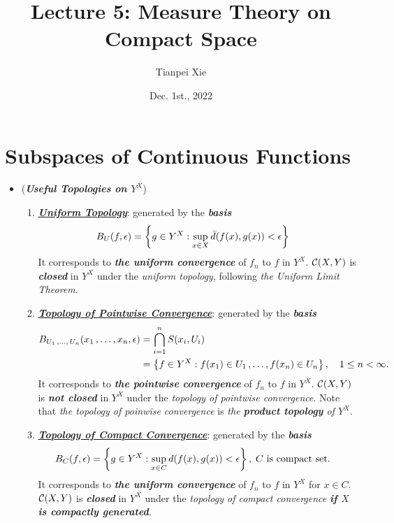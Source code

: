 \documentclass[11pt]{article}
\begin{document}
\title{Lecture 5: Measure Theory on Compact Space}
\author{ Tianpei Xie}
\date{ Dec. 1st., 2022 }
\maketitle
\tableofcontents
\newpage
\section{Subspaces of Continuous Functions}
\begin{itemize}
\item \begin{remark} (\emph{\textbf{Useful Topologies on $Y^X$}})
\begin{enumerate}
\item \underline{\emph{\textbf{Uniform Topology}}}: generated by the \emph{\textbf{basis}}
\begin{align*}
B_{U}(f, \epsilon) &= \left\{g \in Y^X: \sup_{x\in X}\bar{d}(f(x), g(x)) < \epsilon \right\}
\end{align*} It corresponds to \emph{\textbf{the uniform convergence}} of $f_n$ to $f$ in $Y^X$. ${\mathcal C}(X, Y)$ is \emph{\textbf{closed}} in $Y^X$ under the \emph{uniform topology}, following \emph{the Uniform Limit Theorem}.

\item  \underline{\emph{\textbf{Topology of Pointwise Convergence}}}: generated by the \emph{\textbf{basis}}
\begin{align*}
B_{U_1 \,{,}\ldots{,}\, U_n}(x_1 \,{,}\ldots{,}\, x_n, \epsilon)  &= \bigcap_{i=1}^{n}S(x_i, U_i) \\
&= \left\{f \in Y^X: f(x_1) \in U_1 \,{,}\ldots{,}\, f(x_n) \in U_n\right\}, \quad   1 \le n < \infty.
\end{align*} It corresponds to \emph{\textbf{the pointwise convergence}} of $f_n$ to $f$ in $Y^X$. ${\mathcal C}(X, Y)$ is \emph{\textbf{not closed}} in $Y^X$ under the \emph{topology of pointwise convergence}. Note that \emph{the topology of poinwise convergence} is \emph{the \textbf{product topology} of $Y^X$}.

\item \underline{\emph{\textbf{Topology of Compact Convergence}}}: generated by the \emph{\textbf{basis}}
\begin{align*}
B_{C}(f, \epsilon) &= \left\{g \in Y^X: \sup_{x \in C}d(f (x), g(x)) < \epsilon \right\},\; C \text{ is compact set}.
\end{align*} It corresponds to \emph{\textbf{the uniform convergence}} of $f_n$ to $f$ in $Y^X$ for $x \in C$. ${\mathcal C}(X, Y)$ is \emph{\textbf{closed}} in $Y^X$ under the \emph{topology of compact convergence} \emph{\textbf{if $X$ is compactly generated}}.


\end{enumerate}
\end{remark}
\end{itemize}
\end{document}
